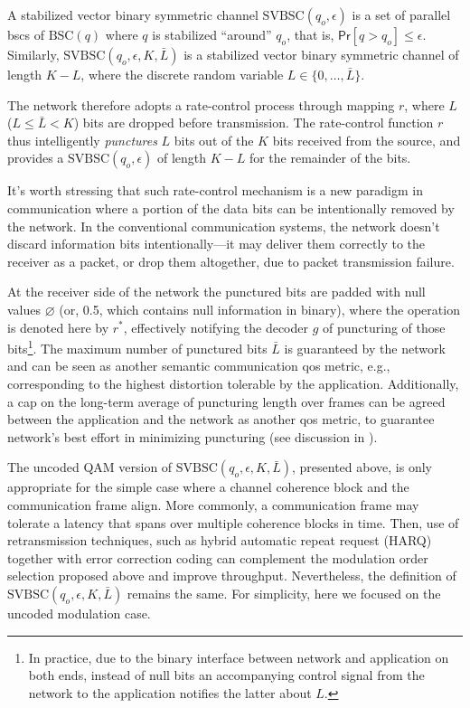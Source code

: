 \begin{definition}
    A stabilized vector binary symmetric channel $\text{SVBSC}(q_o,\epsilon)$ is a set of parallel \glspl{bsc}  of $\text{BSC}(q)$ where $q$ is stabilized ``around'' $q_o$, that is, $\mathsf{Pr}[ q > q_o] \leq \epsilon$. Similarly, $\text{SVBSC}(q_o,\epsilon, K, \bar{L})$ is a stabilized vector binary symmetric channel of length $K-L$, where the discrete random variable $L \in \{0,\ldots, \bar{L}\}$.
\end{definition}

The network therefore adopts a rate-control process through  mapping $r$, where $L$ ($L \leq \bar{L} < K$) bits are dropped before transmission.%
The rate-control function $r$ thus intelligently  \emph{punctures}  $L$ bits out of the $K$ bits received from the source, and provides a $\text{SVBSC}(q_o,\epsilon)$ of length $K - L$ for the remainder of the bits. 

\begin{remark}
    It's worth stressing that such rate-control mechanism is a new paradigm in communication where a portion of the data bits can be intentionally removed by the network. In the conventional communication systems, the network doesn't discard  information bits intentionally---it may deliver them correctly to the receiver as a packet, or drop them altogether, due to packet transmission failure.
\end{remark}

At the receiver side of the network the punctured bits are padded with null values $\varnothing$ (or, 0.5, which contains null information in binary), where the operation is denoted here by $r^{*}$, effectively notifying the decoder $g$ of puncturing of those bits\footnote{In practice, due to the binary interface between network and application on both ends, instead of null bits an accompanying control signal from the network to the application notifies the latter about $L$.}. The maximum number of punctured bits $\bar{L}$ is guaranteed by the network and can be seen as another semantic communication \gls{qos} metric, e.g., corresponding to the highest distortion tolerable by the application. Additionally, a cap on the long-term average of puncturing length over frames can be agreed between the application and the network as another \gls{qos} metric, to guarantee network's best effort in minimizing puncturing (see discussion in ).


\begin{remark}
    The uncoded QAM version of $\text{SVBSC}(q_o,\epsilon, K, \bar{L})$, presented above, is only appropriate for the simple case where a channel coherence block and the communication frame align. More commonly, a communication frame may tolerate a latency that spans over multiple coherence blocks in time. Then, use of retransmission techniques, such as hybrid automatic repeat request (HARQ) together with error correction coding can complement the modulation order selection proposed above and improve throughput. Nevertheless, the definition of $\text{SVBSC}(q_o,\epsilon, K, \bar{L})$ remains the same.  For simplicity, here we focused on the uncoded modulation case.
\end{remark}


